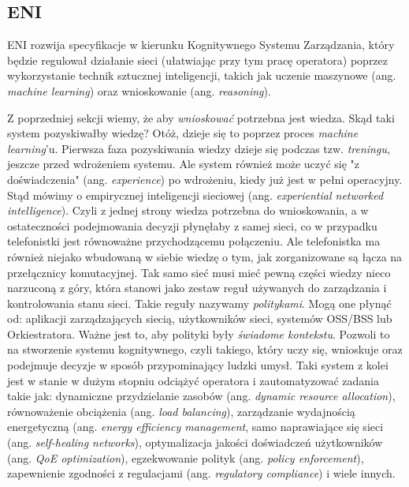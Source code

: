 \subsection{ENI}

ENI rozwija specyfikacje w kierunku Kognitywnego Systemu Zarządzania, który będzie regulował działanie sieci (ułatwiając przy tym pracę operatora) poprzez wykorzystanie technik sztucznej inteligencji, takich jak uczenie maszynowe (ang. \textit{machine learning}) oraz wnioskowanie (ang. \textit{reasoning}). 

Z poprzedniej sekcji wiemy, że aby \textit{wnioskować} potrzebna jest wiedza. Skąd taki system pozyskiwałby wiedzę? Otóż, dzieje się to poprzez proces \textit{machine learning}'u. Pierwsza faza pozyskiwania wiedzy dzieje się podczas tzw. \textit{treningu}, jeszcze przed wdrożeniem systemu. Ale system również może uczyć się "z doświadczenia" (ang. \textit{experience}) po wdrożeniu, kiedy już jest w pełni operacyjny. Stąd mówimy o empirycznej inteligencji sieciowej (ang. \textit{experiential networked intelligence}). Czyli z jednej strony wiedza potrzebna do wnioskowania, a w ostateczności podejmowania decyzji płynęłaby z samej sieci, co w przypadku telefonistki jest równoważne przychodzącemu połączeniu. Ale telefonistka ma również niejako wbudowaną w siebie wiedzę o tym, jak zorganizowane są łącza na przełącznicy komutacyjnej. Tak samo sieć musi mieć pewną części wiedzy nieco narzuconą z góry, która stanowi jako zestaw reguł używanych do zarządzania i kontrolowania stanu sieci. Takie reguły nazywamy \textit{politykami}. Mogą one płynąć od: aplikacji zarządzających siecią, użytkowników sieci, systemów OSS/BSS lub Orkiestratora. Ważne jest to, aby polityki były \textit{świadome kontekstu}. Pozwoli to na stworzenie systemu kognitywnego, czyli takiego, który uczy się, wnioskuje oraz podejmuje decyzje w sposób przypominający ludzki umysł. Taki system z kolei jest w stanie w dużym stopniu odciążyć operatora i zautomatyzować zadania takie jak: dynamiczne przydzielanie zasobów (ang. \textit{dynamic resource allocation}), równoważenie obciążenia (ang. \textit{load balancing}), zarządzanie wydajnością energetyczną (ang. \textit{energy efficiency management}, samo naprawiające się sieci (ang. \textit{self-healing networks}), optymalizacja jakości doświadczeń użytkowników (ang. \textit{QoE optimization}), egzekwowanie polityk (ang. \textit{policy enforcement}), zapewnienie zgodności z regulacjami (ang. \textit{regulatory compliance}) i wiele innych.

